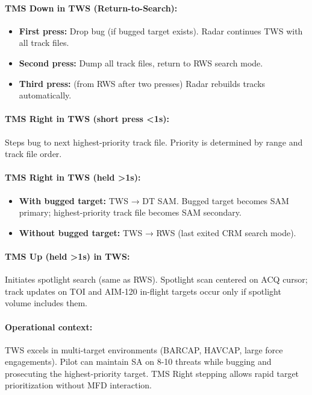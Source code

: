 \documentclass[11pt, a4paper, twoside]{report}
\begin{document}
\paragraph{TMS Down in TWS (Return-to-Search):}
\begin{itemize}
    \item \textbf{First press:} Drop bug (if bugged target exists). Radar continues TWS with all track files.
    \item \textbf{Second press:} Dump all track files, return to RWS search mode.
    \item \textbf{Third press:} (from RWS after two presses) Radar rebuilds tracks automatically.
\end{itemize}

\paragraph{TMS Right in TWS (short press <1s):}
Steps bug to next highest-priority track file. Priority is determined by range and track file order.

\paragraph{TMS Right in TWS (held >1s):}
\begin{itemize}
    \item \textbf{With bugged target:} TWS → DT SAM. Bugged target becomes SAM primary; highest-priority track file becomes SAM secondary.
    \item \textbf{Without bugged target:} TWS → RWS (last exited CRM search mode).
\end{itemize}

\paragraph{TMS Up (held >1s) in TWS:}
Initiates spotlight search (same as RWS). Spotlight scan centered on ACQ cursor; track updates on TOI and AIM-120 in-flight targets occur only if spotlight volume includes them.

\paragraph{Operational context:}
TWS excels in multi-target environments (BARCAP, HAVCAP, large force engagements). Pilot can maintain SA on 8-10 threats while bugging and prosecuting the highest-priority target. TMS Right stepping allows rapid target prioritization without MFD interaction.
\end{document}

